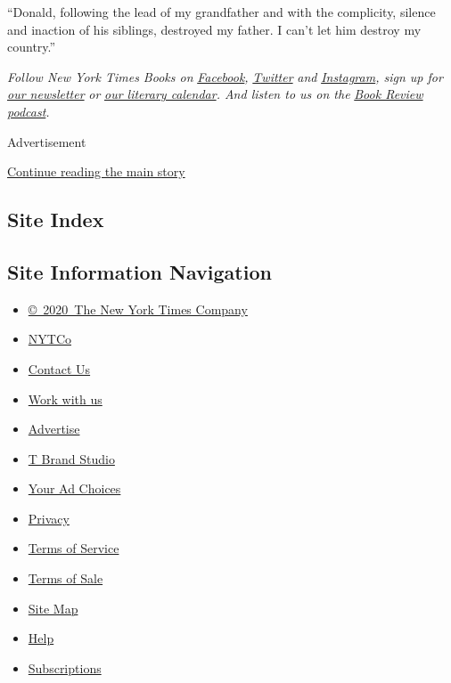 ``Donald, following the lead of my grandfather and with the complicity,
silence and inaction of his siblings, destroyed my father. I can't let
him destroy my country.''

\emph{Follow New York Times Books on}
\href{https://www.facebook.com/nytbooks/}{\emph{Facebook}}\emph{,}
\href{https://twitter.com/nytimesbooks}{\emph{Twitter}} \emph{and}
\href{https://www.instagram.com/nytbooks/}{\emph{Instagram}}\emph{, sign
up for}
\href{https://www.nytimes.com/newsletters/books-review}{\emph{our
newsletter}} \emph{or}
\href{https://www.nytimes.com/interactive/2017/books/books-calendar.html}{\emph{our
literary calendar}}\emph{. And listen to us on the}
\href{https://www.nytimes.com/column/book-review-podcast}{\emph{Book
Review podcast}}\emph{.}

Advertisement

\protect\hyperlink{after-bottom}{Continue reading the main story}

\hypertarget{site-index}{%
\subsection{Site Index}\label{site-index}}

\hypertarget{site-information-navigation}{%
\subsection{Site Information
Navigation}\label{site-information-navigation}}

\begin{itemize}
\tightlist
\item
  \href{https://help.nytimes.com/hc/en-us/articles/115014792127-Copyright-notice}{©~2020~The
  New York Times Company}
\end{itemize}

\begin{itemize}
\tightlist
\item
  \href{https://www.nytco.com/}{NYTCo}
\item
  \href{https://help.nytimes.com/hc/en-us/articles/115015385887-Contact-Us}{Contact
  Us}
\item
  \href{https://www.nytco.com/careers/}{Work with us}
\item
  \href{https://nytmediakit.com/}{Advertise}
\item
  \href{http://www.tbrandstudio.com/}{T Brand Studio}
\item
  \href{https://www.nytimes.com/privacy/cookie-policy\#how-do-i-manage-trackers}{Your
  Ad Choices}
\item
  \href{https://www.nytimes.com/privacy}{Privacy}
\item
  \href{https://help.nytimes.com/hc/en-us/articles/115014893428-Terms-of-service}{Terms
  of Service}
\item
  \href{https://help.nytimes.com/hc/en-us/articles/115014893968-Terms-of-sale}{Terms
  of Sale}
\item
  \href{https://spiderbites.nytimes.com}{Site Map}
\item
  \href{https://help.nytimes.com/hc/en-us}{Help}
\item
  \href{https://www.nytimes.com/subscription?campaignId=37WXW}{Subscriptions}
\end{itemize}
